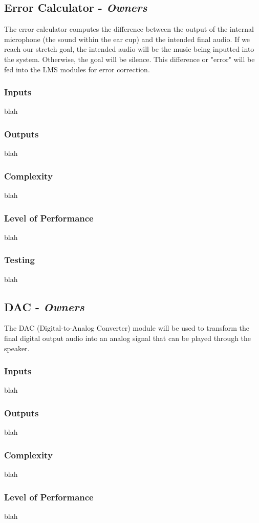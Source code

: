 \documentclass[12pt]{article}
\begin{document}
\begin{multicols}{2}
\subsection{Error Calculator - \textit{Owners}}
The error calculator computes the difference between the output of the internal microphone (the sound within the ear cup) and the intended final audio. If we reach our stretch goal, the intended audio will be the music being inputted into the system. Otherwise, the goal will be silence. This difference or "error" will be fed into the LMS modules for error correction.
\subsubsection{Inputs}
blah
\subsubsection{Outputs}
blah
\subsubsection{Complexity}
blah
\subsubsection{Level of Performance}
blah
\subsubsection{Testing}
blah

\subsection{DAC - \textit{Owners}}
The DAC (Digital-to-Analog Converter) module will be used to transform the final digital output audio into an analog signal that can be played through the speaker.
\subsubsection{Inputs}
blah
\subsubsection{Outputs}
blah
\subsubsection{Complexity}
blah
\subsubsection{Level of Performance}
blah

\end{multicols}
\end{document}
